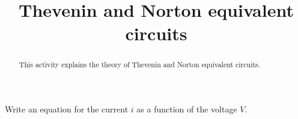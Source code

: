 \documentclass{ximera}
\title{Thevenin and Norton equivalent circuits}
\begin{document}
\begin{abstract}
This activity explains the theory of Thevenin and Norton equivalent circuits.
\end{abstract}

\maketitle



\begin{question}
Write an equation for the current $i$ as a function of the voltage $V$.
\end{question}



\end{document}
